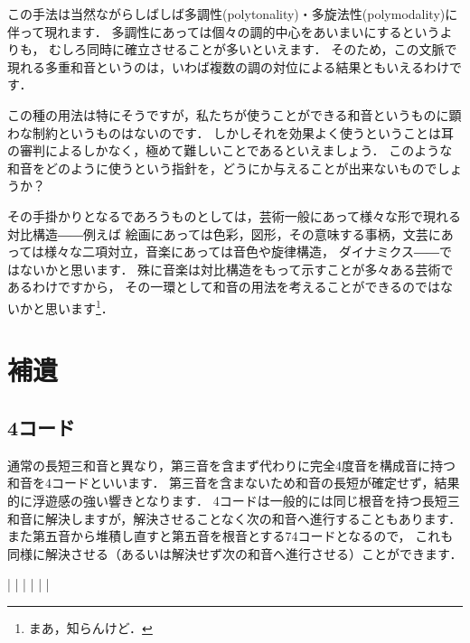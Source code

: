 \documentclass[dvipdfmx,uplatex,b5paper,openany,jbase=12Q,nomag*,textwidth-limit=44%
               ]{gachimuchi}
\begin{document}
この手法は当然ながらしばしば多調性(polytonality)・多旋法性(polymodality)に伴って現れます．
多調性にあっては個々の調的中心をあいまいにするというよりも，
むしろ同時に確立させることが多いといえます．
そのため，この文脈で現れる多重和音というのは，いわば複数の調の対位による結果ともいえるわけです．

この種の用法は特にそうですが，私たちが使うことができる和音というものに顕わな制約というものはないのです．
しかしそれを効果よく使うということは耳の審判によるしかなく，極めて難しいことであるといえましょう．
このような和音をどのように使うという指針を，どうにか与えることが出来ないものでしょうか？

その手掛かりとなるであろうものとしては，芸術一般にあって様々な形で現れる対比構造――例えば
絵画にあっては色彩，図形，その意味する事柄，文芸にあっては様々な二項対立，音楽にあっては音色や旋律構造，
ダイナミクス――ではないかと思います．
殊に音楽は対比構造をもって示すことが多々ある芸術であるわけですから，
その一環として和音の用法を考えることができるのではないかと思います\footnote{まあ，知らんけど．
}．

\chapter{補遺}
\section{\Sus4コード}
通常の長短三和音と異なり，第三音を含まず代わりに完全4度音を構成音に持つ和音を\Sus4コードといいます．
第三音を含まないため和音の長短が確定せず，結果的に浮遊感の強い響きとなります．
\Sus4コードは一般的には同じ根音を持つ長短三和音に解決しますが，解決させることなく次の和音へ進行することもあります．
また第五音から堆積し直すと第五音を根音とする7\Sus4コードとなるので，
これも同様に解決させる（あるいは解決せず次の和音へ進行させる）ことができます．

\begin{Music}[0.8\linewidth]
  \generalmeter{\meterC}%
  \Startpiece
  \NOTes%
  |%
  \en\bar
  \NOTes%
  |%
  \en\doublebar%
  \NOTes%
  |%
  \en\bar
  \NOTes%
  |%
  \en\setdoublebar
  \endpiece
\end{Music}
\end{document}
